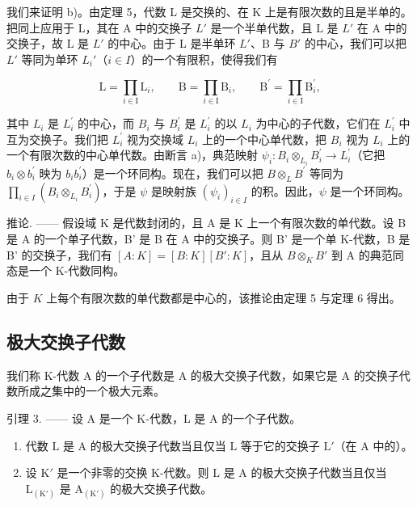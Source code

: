 我们来证明 b)。由定理 5，代数 L 是交换的、在 K 上是有限次数的且是半单的。把同上应用于 L，其在 A 中的交换子 \(L'\) 是一个半单代数，且 L 是 \(L'\) 在 A 中的交换子，故 L 是 \(L'\) 的中心。由于 L 是半单环 \(L'\)、B 与 \(B'\) 的中心，我们可以把 \(L'\) 等同为单环 \(L_{i}'\)（\(i \in I\)）的一个有限积，使得我们有

\[
\mathrm{L} = \prod_ {i \in \mathrm{I}} \mathrm{L} _ {i}, \qquad \mathrm{B} = \prod_ {i \in \mathrm{I}} \mathrm{B} _ {i}, \qquad \mathrm{B} ^ {\prime} = \prod_ {i \in \mathrm{I}} \mathrm{B} _ {i} ^ {\prime},
\]

其中 \(L_{i}\) 是 \(L_{i}^{\prime}\) 的中心，而 \(B_{i}\) 与 \(B_{i}^{\prime}\) 是 \(L_{i}^{\prime}\) 的以 \(L_{i}\) 为中心的子代数，它们在 \(L_{i}^{\prime}\) 中互为交换子。我们把 \(L_{i}^{\prime}\) 视为交换域 \(L_{i}\) 上的一个中心单代数，把 \(B_{i}\) 视为 \(L_{i}\) 上的一个有限次数的中心单代数。由断言 a)，典范映射 \(\psi_{i}: B_{i} \otimes_{L_{i}} B_{i}^{\prime} \to L_{i}^{\prime}\)（它把 \(b_{i} \otimes b_{i}^{\prime}\) 映为 \(b_{i}b_{i}^{\prime}\)）是一个环同构。现在，我们可以把 \(B \otimes_{L} B^{\prime}\) 等同为 \(\prod_{i \in I}(B_{i} \otimes_{L_{i}} B_{i}^{\prime})\)，于是 \(\psi\) 是映射族 \((\psi_{i})_{i \in I}\) 的积。因此，\(\psi\) 是一个环同构。

推论. —— 假设域 K 是代数封闭的，且 A 是 K 上一个有限次数的单代数。设 B 是 A 的一个单子代数，B' 是 B 在 A 中的交换子。则 B' 是一个单 K-代数，B 是 B' 的交换子，我们有 \([A:K]=[B:K][B':K]\)，且从 \(B\otimes_{K}B'\) 到 A 的典范同态是一个 K-代数同构。

由于 \(K\) 上每个有限次数的单代数都是中心的，该推论由定理 5 与定理 6 得出。

\subsection{极大交换子代数}

我们称 K-代数 A 的一个子代数是 A 的极大交换子代数，如果它是 A 的交换子代数所成之集中的一个极大元素。

引理 3. —— 设 A 是一个 K-代数，L 是 A 的一个子代数。

\begin{enumerate}
\def\labelenumi{\alph{enumi})}
\item
  代数 \(\mathrm{L}\) 是 \(\mathrm{A}\) 的极大交换子代数当且仅当 \(\mathrm{L}\) 等于它的交换子 \(\mathrm{L}'\)（在 \(\mathrm{A}\) 中的）。
\item
  设 \(\mathrm{K}'\) 是一个非零的交换 K-代数。则 \(\mathrm{L}\) 是 A 的极大交换子代数当且仅当 \(\mathrm{L}_{(\mathrm{K}')}\) 是 \(\mathrm{A}_{(\mathrm{K}')}\) 的极大交换子代数。
\end{enumerate}

